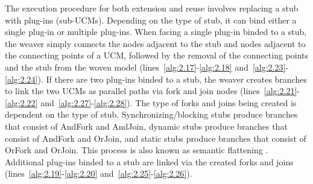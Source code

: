 The execution procedure for both extension and reuse involves replacing a stub with plug-ins (sub-UCMs). Depending on the type of stub, it can bind either a single plug-in or multiple plug-ins. When facing a single plug-in binded to a stub, the weaver simply connects the nodes adjacent to the stub and nodes adjacent to the connecting points of a UCM, followed by the removal of the connecting points and the stub from the woven model (lines~\ref{alg:2.17}-\ref{alg:2.18} and~\ref{alg:2.23}-\ref{alg:2.24}). If there are two plug-ins binded to a stub, the weaver creates branches to link the two UCMs as parallel paths via fork and join nodes (lines~\ref{alg:2.21}-\ref{alg:2.22} and~\ref{alg:2.27}-\ref{alg:2.28}). The type of forks and joins being created is dependent on the type of stub. Synchronizing/blocking stubs produce branches that consist of {\cls AndFork} and {\cls AndJoin}, dynamic stubs produce branches that consist of {\cls AndFork} and {\cls OrJoin}, and static stubs produce branches that consist of {\cls OrFork} and {\cls OrJoin}. This process is also known as semantic flattening \cite{itu2012151}. Additional plug-ins binded to a stub are linked via the created forks and joins (lines~\ref{alg:2.19}-\ref{alg:2.20} and~\ref{alg:2.25}-\ref{alg:2.26}).
